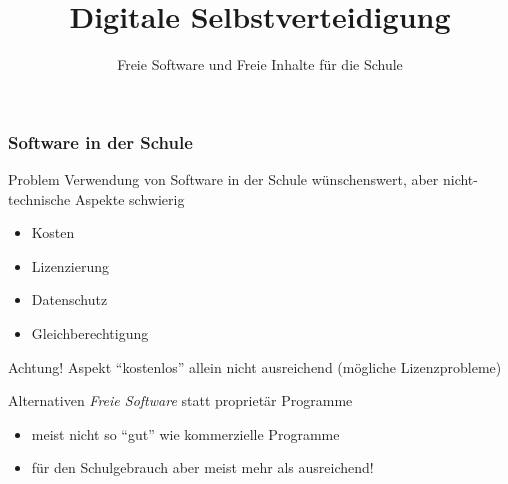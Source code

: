 \documentclass{beamer}
\begin{document}
\title{Digitale Selbstverteidigung}
\subtitle{Freie Software und Freie Inhalte für die Schule}

\maketitle

\begin{frame}
  \frametitle{Software in der Schule}

  \onslide<+->

  \begin{block}{Problem}
    Verwendung von Software in der Schule wünschenswert, aber
    nicht-technische Aspekte schwierig
    \begin{itemize}
    \item Kosten
    \item Lizenzierung
    \item Datenschutz
    \item Gleichberechtigung
    \end{itemize}
  \end{block}

  \onslide<+->

  \begin{block}{Achtung!}
    Aspekt \enquote{kostenlos} allein nicht ausreichend (mögliche
    Lizenzprobleme)
  \end{block}

  \onslide<+->

  \begin{block}{Alternativen}
    \emph{Freie Software} statt proprietär Programme
    \begin{itemize}
    \item meist nicht so \enquote{gut} wie kommerzielle Programme
    \item für den Schulgebrauch aber meist mehr als ausreichend!
    \end{itemize}
  \end{block}

\end{frame}
\end{document}
